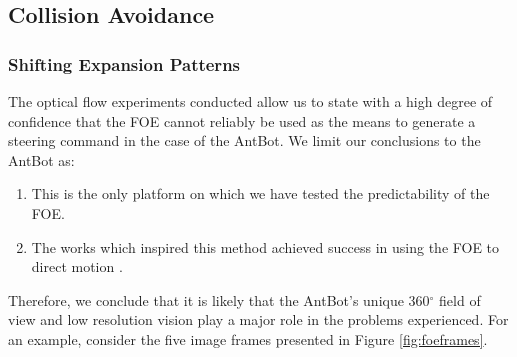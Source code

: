 \documentclass[a4paper,11pt,twoside,openright]{article}
\begin{document}
\subsection{Collision Avoidance}
\subsubsection{Shifting Expansion Patterns}
The optical flow experiments conducted allow us to state with a high
degree of confidence that the FOE cannot reliably be used as the means
to generate a steering command in the case of the AntBot. We limit our
conclusions to the AntBot as:

\begin{enumerate}
\item{This is the only platform on which we have tested the predictability
  of the FOE.}

\item{ The works which inspired this method achieved success in using
  the FOE to direct motion \cite{Stewart2010, Vanderstap2012}.}
\end{enumerate}

Therefore, we conclude that it is likely that the AntBot's unique
360$^\circ$ field of view and low resolution vision play a major role
in the problems experienced. For an example, consider the five image
frames presented in Figure \ref{fig:foeframes}.
\newline\par
\end{document}
